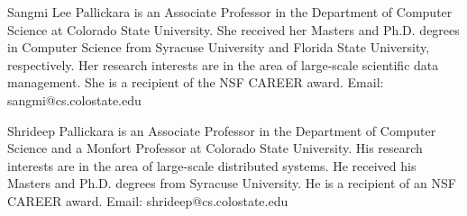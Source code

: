 \documentclass[9pt,journal,compsoc]{IEEEtran}
\begin{document}
%
\vspace{-1.60cm}
\begin{IEEEbiography}{Sangmi Lee Pallickara} is an Associate Professor in the Department of Computer Science at Colorado State University. She received her Masters and Ph.D. degrees in Computer Science from Syracuse University and Florida State University, respectively. Her research interests are in the area of large-scale scientific data management. She is a recipient of the NSF CAREER award. Email: sangmi@cs.colostate.edu
\end{IEEEbiography}
%
\vspace{-1.56cm}
\begin{IEEEbiography}{Shrideep Pallickara} is an Associate Professor in the Department of Computer Science and a Monfort Professor at Colorado State University. His research interests are in the area of large-scale distributed systems. He received his Masters and Ph.D. degrees from Syracuse University. He is a recipient of an NSF CAREER award. Email: shrideep@cs.colostate.edu
\enlargethispage{0.7cm}
\end{IEEEbiography}
\end{document}

